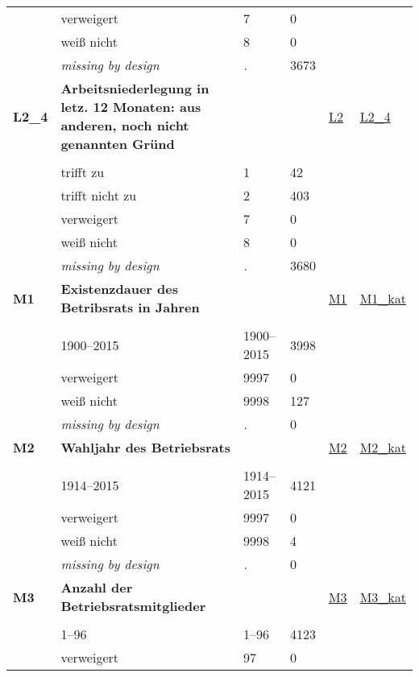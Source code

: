 \begin{longtable}{| L{2.45cm} | L{6cm} | C{1.5cm} | R{1cm} | C{2.25cm} | C{2.25cm} |}
   & verweigert & 7 & 0 &  &  \\ 
   & weiß nicht & 8 & 0 &  &  \\ 
   & \textit{missing by design} & \textit{.} & 3673 &  &  \\ 
   \midrule
\textbf{L2\_4}\label{var:L2:4} & \textbf{Arbeitsniederlegung in letz. 12 Monaten: aus anderen, noch nicht genannten Gründ} &  &  & \hyperref[L2]{L2} & \hyperref[var:suf:L2:4]{L2\_4} \\ 
   &  &  &  &  &  \\ 
   & trifft zu & 1 & 42 &  &  \\ 
   & trifft nicht zu & 2 & 403 &  &  \\ 
   & verweigert & 7 & 0 &  &  \\ 
   & weiß nicht & 8 & 0 &  &  \\ 
   & \textit{missing by design} & \textit{.} & 3680 &  &  \\ 
   \midrule
\textbf{M1}\label{var:M1} & \textbf{Existenzdauer des Betribsrats in Jahren} &  &  & \hyperref[M1]{M1} & \hyperref[var:suf:M1:kat]{M1\_kat} \\ 
   &  &  &  &  &  \\ 
   & 1900--2015 & 1900--2015 & 3998 &  &  \\ 
   & verweigert & 9997 & 0 &  &  \\ 
   & weiß nicht & 9998 & 127 &  &  \\ 
   & \textit{missing by design} & \textit{.} & 0 &  &  \\ 
   \midrule
\textbf{M2}\label{var:M2} & \textbf{Wahljahr des Betriebsrats} &  &  & \hyperref[M2]{M2} & \hyperref[var:suf:M2:kat]{M2\_kat} \\ 
   &  &  &  &  &  \\ 
   & 1914--2015 & 1914--2015 & 4121 &  &  \\ 
   & verweigert & 9997 & 0 &  &  \\ 
   & weiß nicht & 9998 & 4 &  &  \\ 
   & \textit{missing by design} & \textit{.} & 0 &  &  \\ 
   \midrule
\textbf{M3}\label{var:M3} & \textbf{Anzahl der Betriebsratsmitglieder} &  &  & \hyperref[M3]{M3} & \hyperref[var:suf:M3:kat]{M3\_kat} \\ 
   &  &  &  &  &  \\ 
   & 1--96 & 1--96 & 4123 &  &  \\ 
   & verweigert & 97 & 0 &  &  \\ 

\end{longtable}

